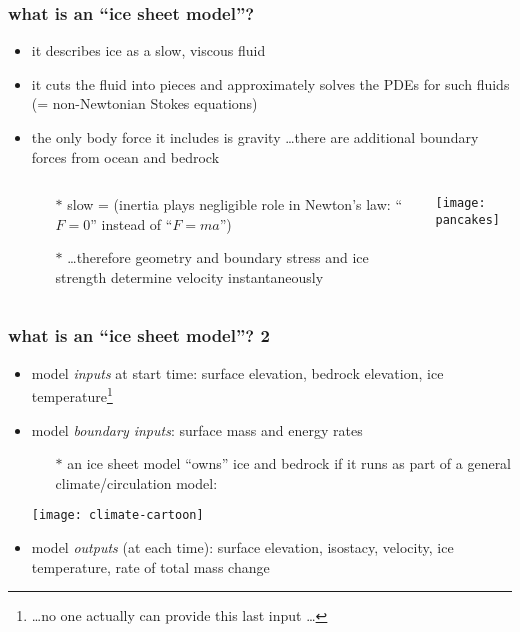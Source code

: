 \documentclass{beamer}
\begin{document}
\begin{frame}
  \frametitle{what is an ``ice sheet model''?}
\small

\vspace{-0.4cm}

\begin{itemize}
\item it describes ice as a slow, viscous fluid
\item it cuts the fluid into pieces and approximately solves the PDEs for such fluids (= non-Newtonian Stokes equations)
\item the only body force it includes is gravity \dots there are additional boundary forces from ocean and bedrock
  \begin{columns}
  \begin{column}{0.6\textwidth}
  \begin{itemize}
  \small
  \item[$\ast$] slow = (inertia plays negligible role in Newton's law: ``$F=0$'' instead of ``$F=ma$'')
  \item[$\ast$] \dots therefore geometry and boundary stress and ice strength determine velocity instantaneously
  \normalsize
  \end{itemize}
  \end{column}
  \begin{column}{0.3\textwidth}
  \texttt{[image: pancakes]}
  \end{column}
  \end{columns}
\end{itemize}
\end{frame}


\begin{frame}
  \frametitle{what is an ``ice sheet model''? 2}
\small

\begin{itemize}
\item model \emph{inputs} at start time: surface elevation, bedrock elevation, ice temperature\footnote{\tiny \dots no one actually can provide this last input \dots}
\item model \emph{boundary inputs}: surface mass and energy rates
  \begin{itemize}
  \item[$\ast$] an ice sheet model ``owns'' ice and bedrock if it runs as part of a general climate/circulation model:
  \end{itemize}
  \begin{center}
  \texttt{[image: climate-cartoon]}
  \end{center}
\item model \emph{outputs} (at each time): surface elevation, isostacy, velocity, ice temperature,  \alert{rate of total mass change}
\end{itemize}


\end{frame}
\end{document}
